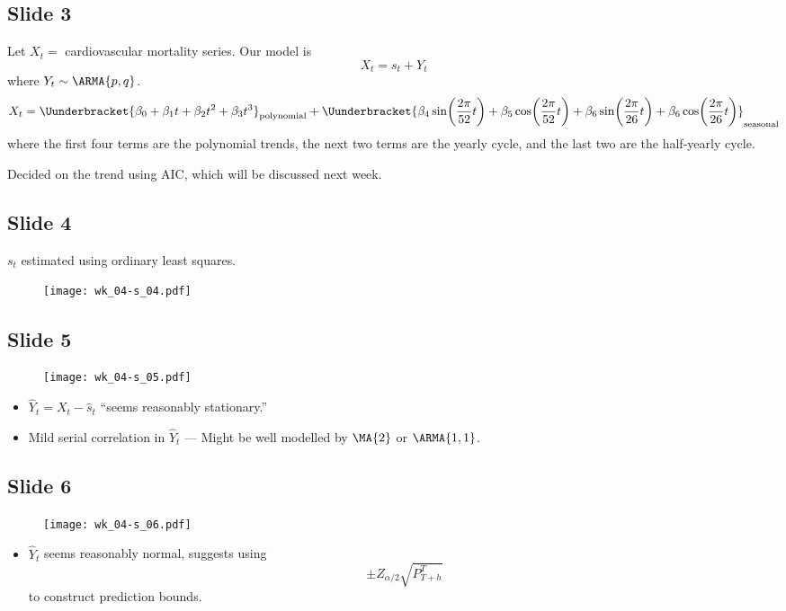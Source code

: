\subsection*{Slide 3}
Let $ X_t= $ cardiovascular mortality series. Our model is
\[ X_t=s_t+Y_t \]
where $ Y_t \sim \ARMA{p,q} $.
\[ X_t=
    \Uunderbracket{\beta_0+\beta_1 t+\beta_2 t^2+\beta_3 t^3}_{\text{polynomial}}
    +\Uunderbracket{\beta_4\sin\biggl(\frac{2\pi}{52}t \biggr)
        +\beta_5\cos\biggl(\frac{2\pi}{52}t \biggr)+\beta_6\sin\biggl(\frac{2\pi}{26}t \biggr)
        +\beta_6\cos\biggl(\frac{2\pi}{26}t \biggr)}_{\text{seasonal}} \]
where the first four terms are the polynomial trends, the next two terms
are the yearly cycle, and the last two are the half-yearly cycle.

Decided on the trend using AIC, which will be discussed next week.

\subsection*{Slide 4}
$ s_t $ estimated using ordinary least squares.
\begin{figure}[H]
    \centering
    \texttt{[image: wk\_04-s\_04.pdf]}
\end{figure}

\subsection*{Slide 5}
\begin{figure}[H]
    \centering
    \texttt{[image: wk\_04-s\_05.pdf]}
\end{figure}
\begin{itemize}
    \item $ \hat{Y}_t=X_t-\hat{s}_t $ ``seems reasonably
          stationary.''
    \item Mild serial correlation in $ \hat{Y}_t $ --- Might be well modelled by $ \MA{2} $ or $ \ARMA{1,1} $.
\end{itemize}

\subsection*{Slide 6}
\begin{figure}[H]
    \centering
    \texttt{[image: wk\_04-s\_06.pdf]}
\end{figure}
\begin{itemize}
    \item $ \hat{Y}_t $ seems reasonably normal, suggests
          using
          \[ \pm Z_{\alpha/2}\sqrt{P_{T+h}^T} \]
          to construct prediction bounds.
\end{itemize}


